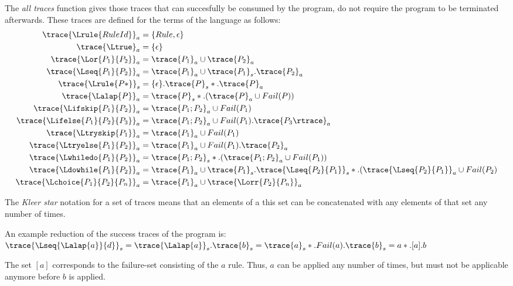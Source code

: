 %
The \emph{all traces} function gives those traces that can succesfully be consumed by the program, do not require the program to be terminated afterwards. These traces are defined for the terms of the language as follows:
%
\begin{align*}
\trace{\Lrule{RuleId}}_{a} &= \{Rule,\epsilon\}\\
\trace{\Ltrue}_{a} &= \{ \epsilon \}\\
\trace{\Lor{P_1}{P_2}}_{a} &= \trace{P_{1}}_{a} \cup \trace{P_{2}}_{a}\\
\trace{\Lseq{P_1}{P_2}}_{a} &= \trace{P_{1}}_{a} \cup \trace{P_{1}}_{s} . \trace{P_{2}}_{a}\\
\trace{\Lrule{P*}}_{s} &= \{\epsilon\} . \trace{P}_{s}* . \trace{P}_{a}\\
\trace{\Lalap{P}}_{a} &= \trace{P}_{s}* . (\trace{P}_{a} \cup Fail(P))\\
\trace{\Lifskip{P_1}{P_2}}_{a} &= \trace{P_1;P_{2}}_{a} \cup Fail(P_1)\\
\trace{\Lifelse{P_1}{P_2}{P_3}}_{a} &= \trace{P_1;P_{2}}_{a} \cup Fail(P_1).\trace{P_{3}\rtrace}_{a}\\
\trace{\Ltryskip{P_1}}_{a} &= \trace{P_{1}}_{a} \cup Fail(P_{1})\\
\trace{\Ltryelse{P_1}{P_2}}_{a} &= \trace{P_{1}}_{a} \cup Fail(P_{1}).\trace{P_{2}}_{a}\\
\trace{\Lwhiledo{P_1}{P_2}}_{a} &= \trace{P_1;P_2}_{s}* . (\trace{P_1;P_2}_{a} \cup Fail(P_1))\\
\trace{\Ldowhile{P_1}{P_2}}_a &= \trace{P_1}_a \cup \trace{P_1}_s . \trace{\Lseq{P_2}{P_1}}_s* . ( \trace{\Lseq{P_2}{P_1}}_a \cup Fail(P_2)\\
\trace{\Lchoice{P_1}{P_2}{P_n}}_{a} &= \trace{P_1}_{a} \cup \trace{\Lorr{P_2}{P_n}}_{a}\\
\end{align*}

The \emph{Kleer star} notation for a set of traces means that an elements of a this set can be concatenated with any elements of that set any number of times.

An example reduction of the success traces of the program  is:
\begin{math}
\trace{\Lseq{\Lalap{a}}{d}}_{s} = 
\trace{\Lalap{a}}_{s} . \trace{b}_{s} =
\trace{a}_{s}* . Fail(a) . \trace{b}_{s} =
a*.[a].b\\
\end{math}

The set $[a]$ corresponds to the failure-set consisting of the $a$ rule. Thus, $a$ can be applied any number of times, but must not be applicable anymore before $b$ is applied.

